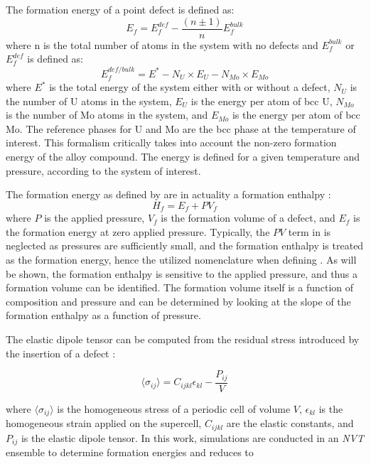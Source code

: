 \documentclass[review]{elsarticle}
\begin{document}
The formation energy of a point defect is defined as:
\begin{equation}\label{eq:eform1}
 E_f = E_f^{def} - \frac{(n\pm1)}{n}E_f^{bulk}
\end{equation}
\noindent where n is the total number of atoms in the system with no defects and $E_f^{bulk}$ or $E_f^{def}$ is defined as:
\begin{equation}\label{eq:eform2}
E_f^{def/bulk} = E^* - N_U \times E_U - N_{Mo} \times E_{Mo}
\end{equation}
\noindent where $E^*$ is the total energy of the system either with or without a defect, $N_U$ is the number of U atoms in the system, $E_U$ is the energy per atom of bcc U, $N_{Mo}$ is the number of Mo atoms in the system, and $E_{Mo}$ is the energy per atom of bcc Mo. The reference phases for U and Mo are the bcc phase at the temperature of interest. This formalism critically takes into account the non-zero formation energy of the alloy compound. The energy is defined for a given temperature and pressure, according to the system of interest. 

The formation energy as defined by  are in actuality a formation enthalpy \cite{kraftmakher1998}:
\begin{equation}\label{eq:enthalpy}
 H_f = E_f + PV_f 
\end{equation}
\noindent where $P$ is the applied pressure, $V_f$ is the formation volume of a defect, and $E_f$ is the formation energy at zero applied pressure. Typically, the $PV$ term in  is neglected as pressures are sufficiently small, and the formation enthalpy is treated as the formation energy, hence the utilized nomenclature when defining . As will be shown, the formation enthalpy is sensitive to the applied pressure, and thus a formation volume can be identified. The formation volume itself is a function of composition and pressure and can be determined by looking at the slope of the formation enthalpy as a function of pressure. 

The elastic dipole tensor can be computed from the residual stress introduced by the insertion of a defect \cite{varvenne2017}:

\begin{equation}\label{eq:dipole1}
    \langle \sigma_{ij} \rangle = C_{ijkl}\epsilon_{kl} - \frac{P_{ij}}{V}
\end{equation}

\noindent where $\langle \sigma_{ij} \rangle$ is the homogeneous stress of a periodic cell of volume $V$, $\epsilon_{kl}$ is the homogeneous strain applied on the supercell, $C_{ijkl}$ are the elastic constants, and $P_{ij}$ is the elastic dipole tensor. In this work, simulations are conducted in an \textit{NVT} ensemble to determine formation energies and  reduces to 
\end{document}

